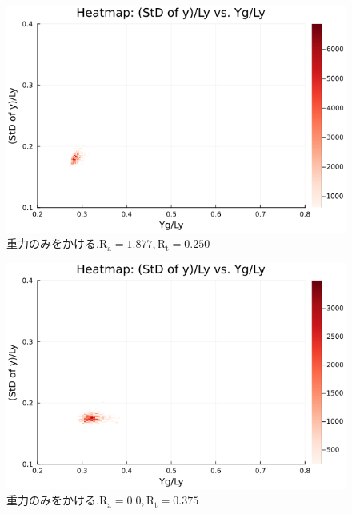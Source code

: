 \begin{figure}[H]
  \centering
  \includegraphics[scale=0.6]{image/dT0_heat/2024-01-15T14:30:47.794_mapg0_chi0_Ay50_rho0.4_T0.43_dT0.0_Rd0.0_Rt0.25_Ra1.877538_g0.0003999718779659611_run4.0e7.png}
  \caption{$重力のみをかける. \text{R}_\text{a}=1.877,\text{R}_\text{t}=0.250$}
  \label{}
\end{figure}

\begin{figure}[H]
  \centering
  \includegraphics[scale=0.6]{image/dT0_heat/2024-01-15T14:30:47.876_mapg0_chi0_Ay50_rho0.4_T0.43_dT0.0_Rd0.0_Rt0.375_Ra0.0_g0.0003999718779659611_run4.0e7.png}
  \caption{$重力のみをかける. \text{R}_\text{a}=0.0,\text{R}_\text{t}=0.375$}
  \label{}
\end{figure}

